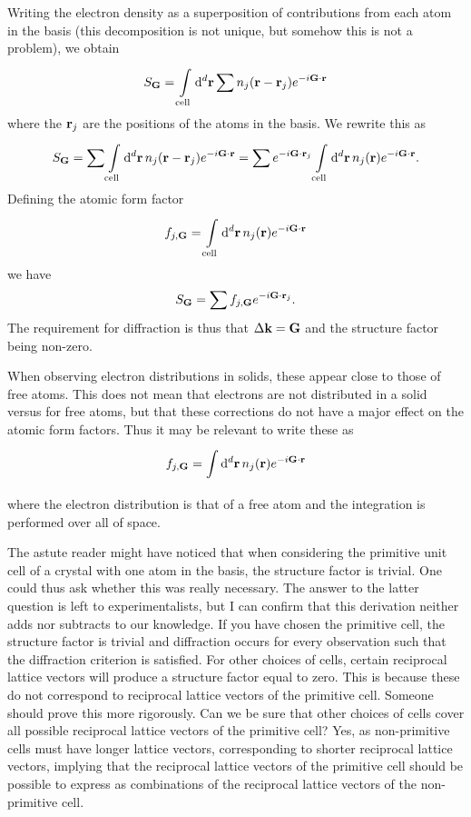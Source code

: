 Writing the electron density as a superposition of contributions from each atom in the basis (this decomposition is not unique, but somehow this is not a problem), we obtain
\begin{align*}
	S_{\vb{G}} = \integ[d]{\text{cell}}{}{\vb{r}}{\sum n_{j}(\vb{r} - \vb{r}_{j})e^{-i\vb{G}\cdot\vb{r}}}
\end{align*}
where the $\vb{r}_{j}$ are the positions of the atoms in the basis. We rewrite this as
\begin{align*}
	S_{\vb{G}} = \sum\integ[d]{\text{cell}}{}{\vb{r}}{n_{j}(\vb{r} - \vb{r}_{j})e^{-i\vb{G}\cdot\vb{r}}} = \sum e^{-i\vb{G}\cdot\vb{r}_{j}}\integ[d]{\text{cell}}{}{\vb{r}}{n_{j}(\vb{r})e^{-i\vb{G}\cdot\vb{r}}}.
\end{align*}
Defining the atomic form factor
\begin{align*}
	f_{j, \vb{G}} = \integ[d]{\text{cell}}{}{\vb{r}}{n_{j}(\vb{r})e^{-i\vb{G}\cdot\vb{r}}}
\end{align*}
we have
\begin{align*}
	S_{\vb{G}} = \sum f_{j, \vb{G}}e^{-i\vb{G}\cdot\vb{r}_{j}}.
\end{align*}
The requirement for diffraction is thus that $\Delta\vb{k} = \vb{G}$ and the structure factor being non-zero.

When observing electron distributions in solids, these appear close to those of free atoms. This does not mean that electrons are not distributed in a solid versus for free atoms, but that these corrections do not have a major effect on the atomic form factors. Thus it may be relevant to write these as
\begin{align*}
	f_{j, \vb{G}} = \integ[d]{}{}{\vb{r}}{n_{j}(\vb{r})e^{-i\vb{G}\cdot\vb{r}}}
\end{align*}
where the electron distribution is that of a free atom and the integration is performed over all of space.

The astute reader might have noticed that when considering the primitive unit cell of a crystal with one atom in the basis, the structure factor is trivial. One could thus ask whether this was really necessary. The answer to the latter question is left to experimentalists, but I can confirm that this derivation neither adds nor subtracts to our knowledge. If you have chosen the primitive cell, the structure factor is trivial and diffraction occurs for every observation such that the diffraction criterion is satisfied. For other choices of cells, certain reciprocal lattice vectors will produce a structure factor equal to zero. This is because these do not correspond to reciprocal lattice vectors of the primitive cell. Someone should prove this more rigorously. Can we be sure that other choices of cells cover all possible reciprocal lattice vectors of the primitive cell? Yes, as non-primitive cells must have longer lattice vectors, corresponding to shorter reciprocal lattice vectors, implying that the reciprocal lattice vectors of the primitive cell should be possible to express as combinations of the reciprocal lattice vectors of the non-primitive cell.

